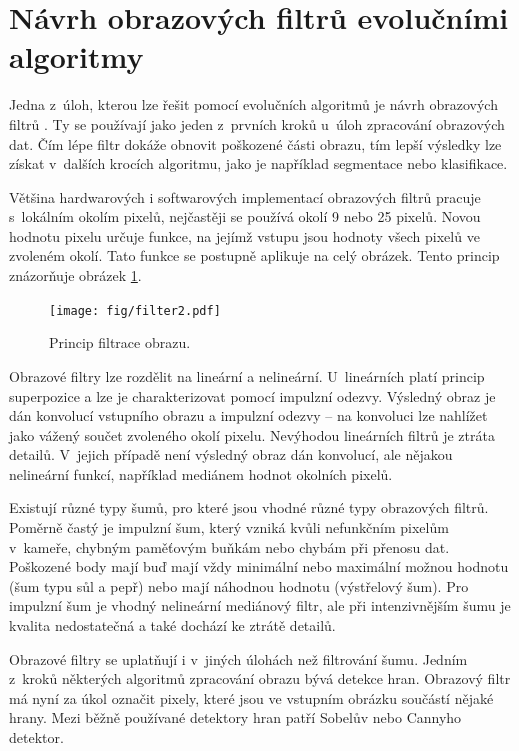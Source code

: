\section{Návrh obrazových filtrů evolučními algoritmy}
\label{secIF}

Jedna z~úloh, kterou lze řešit pomocí evolučních algoritmů je návrh obrazových filtrů \cite{ZelenaIF}. Ty se používají jako jeden z~prvních kroků u~úloh zpracování obrazových dat. Čím lépe filtr dokáže obnovit poškozené části obrazu, tím lepší výsledky lze získat v~dalších krocích algoritmu, jako je například segmentace nebo klasifikace.

Většina hardwarových i softwarových implementací obrazových filtrů pracuje s~lokálním okolím pixelů, nejčastěji se používá okolí 9 nebo 25 pixelů. Novou hodnotu pixelu určuje funkce, na jejímž vstupu jsou hodnoty všech pixelů ve zvoleném okolí. Tato funkce se postupně aplikuje na celý obrázek. Tento princip znázorňuje obrázek \ref{obrIFokoli}.

\begin{figure}[htb]
    \centering\texttt{[image: fig/filter2.pdf]}
    \caption{Princip filtrace obrazu.}
    \label{obrIFokoli}
\end{figure}

Obrazové filtry lze rozdělit na lineární a nelineární. U~lineárních platí princip superpozice a lze je charakterizovat pomocí impulzní odezvy. Výsledný obraz je dán konvolucí vstupního obrazu a impulzní odezvy -- na konvoluci lze nahlížet jako vážený součet zvoleného okolí pixelu. Nevýhodou lineárních filtrů je ztráta detailů. V~jejich případě není výsledný obraz dán konvolucí, ale nějakou nelineární funkcí, například mediánem hodnot okolních pixelů.

Existují různé typy šumů, pro které jsou vhodné různé typy obrazových filtrů. Poměrně častý je impulzní šum, který vzniká kvůli nefunkčním pixelům v~kameře, chybným paměťovým buňkám nebo chybám při přenosu dat. Poškozené body mají buď mají vždy minimální nebo maximální možnou hodnotu (šum typu sůl a pepř) nebo mají náhodnou hodnotu (výstřelový šum). Pro impulzní šum je vhodný nelineární mediánový filtr, ale při intenzivnějším šumu je kvalita nedostatečná a také dochází ke ztrátě detailů.

Obrazové filtry se uplatňují i v~jiných úlohách než filtrování šumu. Jedním z~kroků některých algoritmů zpracování obrazu bývá detekce hran. Obrazový filtr má nyní za úkol označit pixely, které jsou ve vstupním obrázku součástí nějaké hrany. Mezi běžně používané detektory hran patří Sobelův nebo Cannyho detektor.

